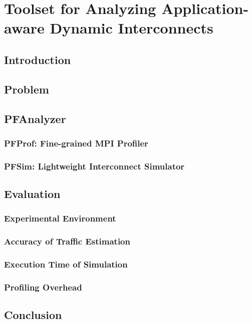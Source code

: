 \chapter{Toolset for Analyzing Application-aware Dynamic Interconnects}

\section{Introduction}

\section{Problem}

\section{PFAnalyzer}

\subsection{PFProf: Fine-grained MPI Profiler}

\subsection{PFSim: Lightweight Interconnect Simulator}

\section{Evaluation}

\subsection{Experimental Environment}

\subsection{Accuracy of Traffic Estimation}

\subsection{Execution Time of Simulation}

\subsection{Profiling Overhead}

\section{Conclusion}

